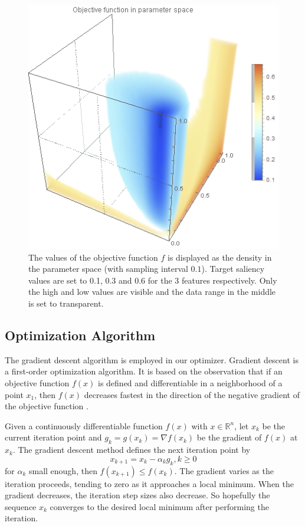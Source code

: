 \begin{figure}
	\centering
	\begin{minipage}{.6\textwidth}
		\includegraphics[width=1\linewidth]{images/nucleon_strong_red_parameterspace}
	\end{minipage}
	\caption{The values of the objective function $  f $ is displayed as the density in the parameter space (with sampling interval $ 0.1 $). Target saliency values are set to 0.1, 0.3 and 0.6 for the 3 features respectively. Only the high and low values are visible and the data range in the middle is set to transparent.}
	\label{fig:nucleon_parameterspace}
\end{figure}

\subsection{Optimization Algorithm}
The gradient descent algorithm is employed in our optimizer.
Gradient descent is a first-order optimization algorithm. It is based on the observation that if an objective function $ f(x) $ is defined and differentiable in a neighborhood of a point $ x_{1} $, then $ f(x) $ decreases fastest in the direction of the negative gradient of the objective function \cite{chong_introduction_2013}.

Given a continuously differentiable function $ f(x) $ with $ x \in \mathbb{R}^{n} $, let $ x_{k} $ be the current iteration point and $ g_{k}=g(x_{k})= \nabla f(x_{k}) $ be the gradient of $ f(x) $ at $ x_{k} $. The gradient descent method defines the next iteration point by
\[ x_{k+1}=x_{k}- \alpha_{k} g_{k} , k \geq 0 \]
for $ \alpha_{k} $ small enough, then $ f(x_{k+1}) \leq f(x_{k}) $. The gradient varies as the iteration proceeds, tending to zero as it approaches a local minimum. When the gradient decreases, the iteration step sizes also decrease. So hopefully the sequence $ {x_{k}} $ converges to the desired local minimum after performing the iteration.

